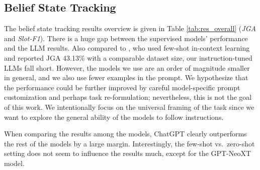 \subsection{Belief State Tracking}
\label{subsec:dst}
The belief state tracking results overview is given in Table \ref{tab:res_overall} (\emph{JGA} and \emph{Slot-F1}).
There is a huge gap between the supervised models' performance and the LLM results.
Also compared to \citet{hu-etal-2022-context}, who used few-shot in-context learning and reported JGA 43.13\% with a comparable dataset size, our instruction-tuned LLMs fall short.
However, the models we use are an order of magnitude smaller in general, and we also use fewer examples in the prompt.
We hypothesize that the performance could be further improved by careful model-specific prompt customization and perhaps task re-formulation; nevertheless, this is not the goal of this work.
We intentionally focus on the universal framing of the task since we want to explore the general ability of the models to follow instructions.

When comparing the results among the models, ChatGPT clearly outperforms the rest of the models by a large margin. 
Interestingly, the few-shot vs.\ zero-shot setting does not seem to influence the results much, except for the GPT-NeoXT model.

